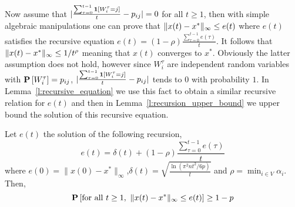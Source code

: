 Now assume that $|\frac{\sum_{\tau=0}^{t-1} \bm{1}{\left[W_i^{\tau}=j\right]}}{t}- p_{ij}| = 0$ 
for all $t\geq 1$, then with simple algebraic manipulations 
one can prove that $\| x(t)-x^* \|_{\infty} \leq e(t)$ where $e(t)$ 
satisfies the recursive equation $e(t) = (1-\rho)\frac{\sum_{\tau=0}^{t-1}e(\tau)}{t}$.
It follows that $\| x(t)-x^* \|_{\infty} \leq 1/t^\rho$ 
meaning that $x(t)$ converges to $x^*$.
Obviously the latter assumption does not hold,
however since $W_i^{\tau}$ are independent random variables
with $\bm{\mathrm{P}}\left[W_i^\tau\right]=p_{ij}$,
$|\frac{\sum_{\tau=0}^{t-1} \bm{1}{\left[W_i^{\tau}=j\right]}}{t} - p_{ij}|$ 
tends to $0$ with probability $1$. 
In Lemma~\ref{l:recursive_equation} we use this fact
to obtain a similar recursive relation for $e(t)$ 
and then in Lemma~\ref{l:recursion_upper_bound}
we upper bound the solution of this recursive equation.
\begin{lemma}\label{l:recursive_equation}
Let $e(t)$ the solution of the following recursion,
\[e(t) =\delta(t) + (1-\rho)\frac{\sum_{\tau=0}^{t-1}e(\tau)}{t}\]
where $e(0)=\|x(0) - x^*\|_{\infty}$,\(\delta(t) = \sqrt{\frac{\ln(\pi^2n t^2/6p)}{t}}\)
and $\rho = \min_{i \in V}\alpha_i$. Then,
\[\bm{\mathrm{P}}\left[\text{for all }t \geq 1, ~\| x(t)-x^* \|_{\infty}\leq e(t)\right] \geq 1-p\]
\end{lemma}
